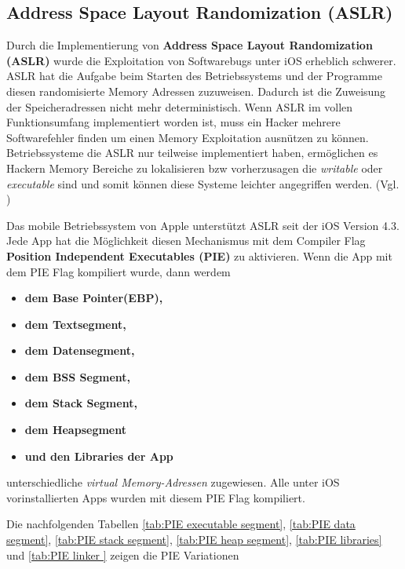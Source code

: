 \subsection{Address Space Layout Randomization (ASLR)}
\label{sec:ASLR}

Durch die Implementierung von \textbf{Address Space Layout Randomization (ASLR)} wurde die Exploitation von Softwarebugs unter iOS erheblich schwerer. ASLR hat die Aufgabe beim Starten des Betriebssystems und der Programme diesen randomisierte Memory Adressen zuzuweisen. Dadurch ist die Zuweisung der Speicheradressen nicht mehr deterministisch. Wenn ASLR im vollen Funktionsumfang implementiert worden ist, muss ein Hacker mehrere Softwarefehler finden um einen Memory Exploitation ausnützen zu können. Betriebssysteme die ASLR nur teilweise implementiert haben, ermöglichen es Hackern Memory Bereiche zu lokalisieren bzw vorherzusagen die \textit{\glqq writable\grqq{}} oder \textit{\glqq executable\grqq{}} sind und somit können diese Systeme leichter angegriffen werden. (Vgl. \cite{Apple[4], ASLR[1], ASLR[2], ASLR[3], ASLR[4]})	 \par

Das mobile Betriebssystem von Apple unterstützt ASLR seit der iOS Version 4.3. Jede App hat die Möglichkeit diesen Mechanismus mit dem Compiler Flag \textbf{Position Independent Executables (PIE)} zu aktivieren. Wenn die App mit dem PIE Flag kompiliert wurde, dann werdem
\begin{itemize}
    \item \textbf{dem Base Pointer(EBP),}
    \item \textbf{dem Textsegment,} 
    \item \textbf{dem Datensegment,}
    \item \textbf{dem BSS Segment,} 
    \item \textbf{dem Stack Segment,}
    \item \textbf{dem Heapsegment}
    \item \textbf{und den Libraries der App}
\end{itemize}
unterschiedliche \textit{\glqq virtual Memory-Adressen\grqq{}} zugewiesen. Alle unter iOS vorinstallierten Apps wurden mit diesem PIE Flag kompiliert. 

Die nachfolgenden Tabellen \ref{tab:PIE executable segment}, \ref{tab:PIE data segment}, \ref{tab:PIE stack segment}, \ref{tab:PIE heap segment}, \ref{tab:PIE libraries} und \ref{tab:PIE linker } zeigen die PIE Variationen

